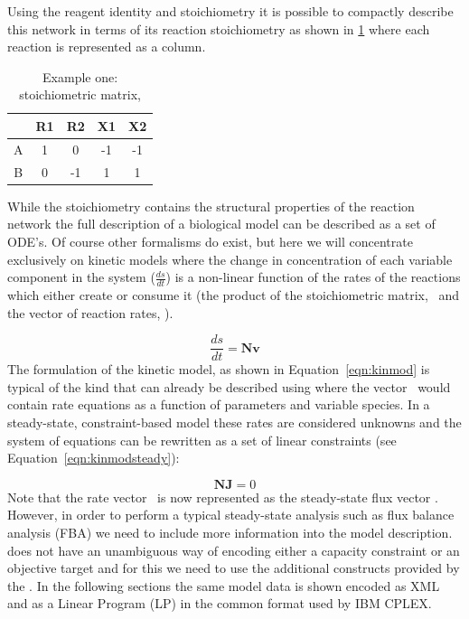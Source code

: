 %
%
Using the reagent identity and stoichiometry it is possible to compactly
describe this network in terms of its reaction stoichiometry as shown in
\ref{tble:ex1nmat} where each reaction is represented as a column. 

\begin{table}[h]
  \centering
    \begin{tabular}{c|cccc}
          & R1 & R2 & X1 & X2 \\ \hline
        A & 1 &  0 & -1 & -1 \\
        B & 0 & -1 &  1 &  1 \\
    \end{tabular}
  \caption{Example one: stoichiometric matrix, \Nmat}
  \label{tble:ex1nmat}
\end{table}
%
While the stoichiometry contains the structural properties of the
reaction network the full description of a biological model can be
described as a set of ODE's. Of course other formalisms do exist, but here we will concentrate exclusively on kinetic models where the change in concentration of each variable component in the system ($\frac{ds}{dt}$) is a non-linear function of the rates of the reactions which either create or consume it (the product of the stoichiometric matrix, \Nmat\ and the vector of reaction rates, \vvec).

%
\begin{equation}\label{eqn:kinmod}
  \frac{ds}{dt} = \textbf{Nv}
\end{equation}
%
The formulation of the kinetic model, as shown in
Equation~\ref{eqn:kinmod} is typical of the kind that can already be
described using \sbmlthreecore where the vector \vvec\ would contain
rate equations as a function of parameters and variable species. In a
steady-state, constraint-based model these rates are considered unknowns
and the system of equations can be rewritten as a set of linear
constraints (see Equation~\ref{eqn:kinmodsteady}):


%
\begin{equation}\label{eqn:kinmodsteady}
  \textbf{NJ} = 0
\end{equation}
%
Note that the rate vector \vvec\ is now represented as the steady-state
flux vector \Jvec. However, in order to perform a typical steady-state
analysis such as flux balance analysis (FBA) we need to include more
information into the model description. \sbmlthreecore does not have an
unambiguous way of encoding either a capacity constraint or an objective
target and for this we need to use the additional constructs provided by
the \FBCPackage. In the following sections the same model data is shown
encoded as XML and as a Linear Program (LP) in the common format used by
IBM \textsf{CPLEX}.


